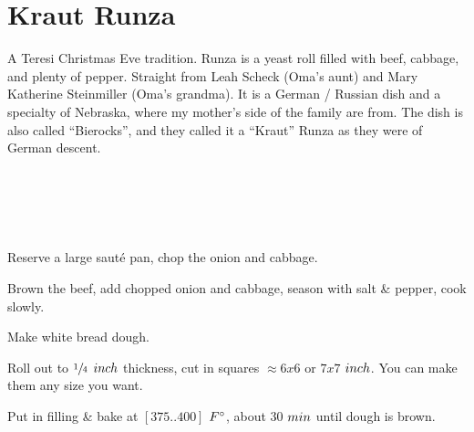 \section[Kraut Runza]{Kraut Runza}

\begin{recipestats}[
        servings=12,
        preptime=4~\hour,
        bakingtime=30~\minute,
        original=Mrs. Sheck \& Mrs. Steinmiller,
    ]
\end{recipestats}

\begin{recipeabstract}
    A Teresi Christmas Eve tradition.
    Runza is a yeast roll filled with beef, cabbage, and plenty of pepper.
    Straight from Leah Scheck (Oma's aunt) and Mary Katherine Steinmiller (Oma's grandma).
    It is a German / Russian dish and a specialty of Nebraska, where my mother's side of the family are from.
    The dish is also called ``Bierocks'', and they called it a ``Kraut'' Runza as they were of German descent.
\end{recipeabstract}

\begin{ingredientcolumns}
    \begin{ingredientblock}
        \\
        \\
    \end{ingredientblock}
    \begin{ingredientblock}
        \\
    \end{ingredientblock}
\end{ingredientcolumns}

\begin{preparation}
\item Reserve a large saut\'{e} pan, chop the onion and cabbage.
\item Brown the beef, add chopped onion and cabbage, season with salt \& pepper, cook slowly.
\item Make white bread dough.
\item Roll out to $\onefourth$ $\inch$ thickness, cut in squares $\approx6x6$ or $7x7$ $\inch$.
    You can make them any size you want.
\item Put in filling \& bake at $[375..400]$ $\Fahrenheit$, about 30 $\minute$ until dough is brown.
\end{preparation}

\recipeend%
